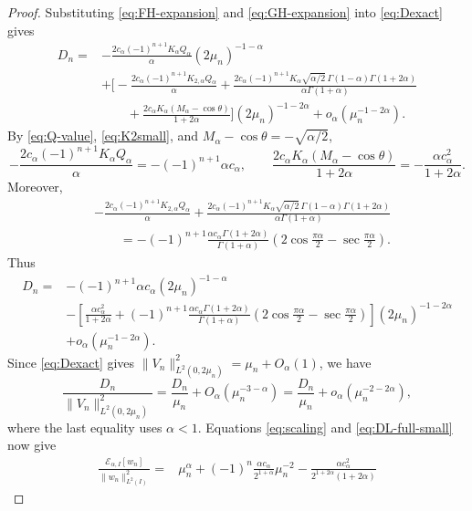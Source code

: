 \documentclass[11pt]{amsart}
\numberwithin{equation}{section}
\theoremstyle{remark}
\newcommand{\norm}[2][]{\lVert #2\rVert_{#1}}
\newcommand{\calE}{\mathcal E}
\begin{document}
\begin{proof}
Substituting \eqref{eq:FH-expansion} and \eqref{eq:GH-expansion}
into \eqref{eq:Dexact} gives
\[
 \begin{aligned}
 D_n={}&-\frac{2c_\alpha(-1)^{n+1}K_\alpha Q_\alpha}{\alpha}
 (2\mu_n)^{-1-\alpha}\\
 &+\biggl[
 -\frac{2c_\alpha(-1)^{n+1}K_{2,\alpha}Q_\alpha}{\alpha}
 +\frac{2c_\alpha(-1)^{n+1}K_\alpha\sqrt{\alpha/2}\,
 \Gamma(1-\alpha)\Gamma(1+2\alpha)}
 {\alpha\Gamma(1+\alpha)}\\
 &\qquad+\frac{2c_\alpha K_\alpha(M_\alpha-\cos\theta)}
 {1+2\alpha}\biggr](2\mu_n)^{-1-2\alpha}
 +o_\alpha(\mu_n^{-1-2\alpha}).
 \end{aligned}
\]
By \eqref{eq:Q-value}, \eqref{eq:K2small}, and
$M_\alpha-\cos\theta=-\sqrt{\alpha/2}$,
\[
 -\frac{2c_\alpha(-1)^{n+1}K_\alpha Q_\alpha}{\alpha}
 =-(-1)^{n+1}\alpha c_\alpha,
 \qquad
 \frac{2c_\alpha K_\alpha(M_\alpha-\cos\theta)}{1+2\alpha}
 =-\frac{\alpha c_\alpha^2}{1+2\alpha}.
\]
Moreover,
\[
 \begin{aligned}
 &-\frac{2c_\alpha(-1)^{n+1}K_{2,\alpha}Q_\alpha}{\alpha}
 +\frac{2c_\alpha(-1)^{n+1}K_\alpha\sqrt{\alpha/2}\,
 \Gamma(1-\alpha)\Gamma(1+2\alpha)}
 {\alpha\Gamma(1+\alpha)}\\
 &\qquad=-(-1)^{n+1}
 \frac{\alpha c_\alpha\Gamma(1+2\alpha)}{\Gamma(1+\alpha)}
 \left(2\cos\frac{\pi\alpha}{2}
 -\sec\frac{\pi\alpha}{2}\right).
 \end{aligned}
\]
Thus
\begin{equation}\label{eq:DL-full-small}
 \begin{aligned}
 D_n={}&-(-1)^{n+1}\alpha c_\alpha(2\mu_n)^{-1-\alpha}\\
 &-\left[\frac{\alpha c_\alpha^2}{1+2\alpha}
 +(-1)^{n+1}
 \frac{\alpha c_\alpha\Gamma(1+2\alpha)}{\Gamma(1+\alpha)}
 \left(2\cos\frac{\pi\alpha}{2}
 -\sec\frac{\pi\alpha}{2}\right)\right]
 (2\mu_n)^{-1-2\alpha}\\
 &+o_\alpha(\mu_n^{-1-2\alpha}).
 \end{aligned}
\end{equation}
Since \eqref{eq:Dexact} gives
$\norm[L^2(0,2\mu_n)]{V_n}^2=\mu_n+O_\alpha(1)$, we have
\[
 \frac{D_n}{\norm[L^2(0,2\mu_n)]{V_n}^2}
 =\frac{D_n}{\mu_n}+O_\alpha(\mu_n^{-3-\alpha})
 =\frac{D_n}{\mu_n}+o_\alpha(\mu_n^{-2-2\alpha}),
\]
where the last equality uses $\alpha<1$.  Equations \eqref{eq:scaling} and
\eqref{eq:DL-full-small} now give
\[
 \begin{aligned}
 \frac{\calE_{\alpha,I}[w_n]}{\norm[L^2(I)]{w_n}^2}
 ={}&\mu_n^\alpha
 +(-1)^n\frac{\alpha c_\alpha}{2^{1+\alpha}}\mu_n^{-2}-\frac{\alpha c_\alpha^2}{2^{1+2\alpha}(1+2\alpha)}

\end{aligned}\]
\end{proof}
\end{document}
